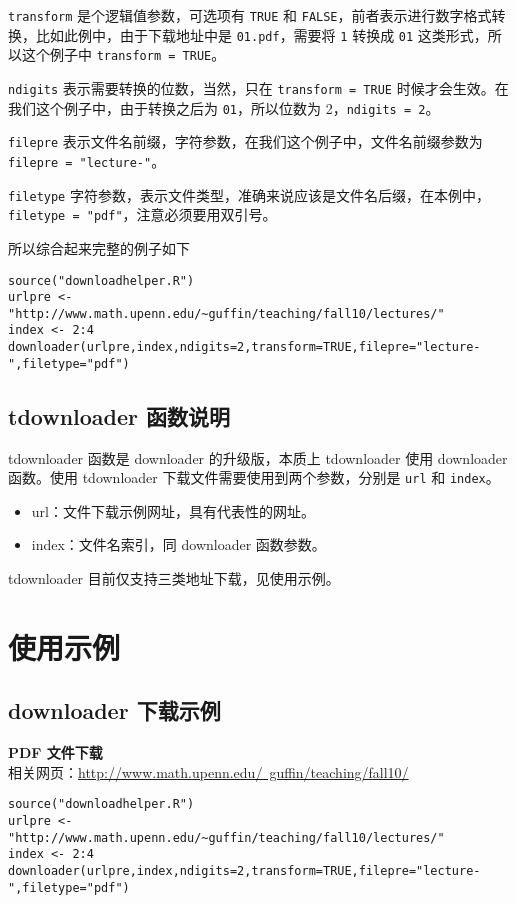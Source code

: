 \documentclass{article}
\begin{document}
\lstinline{transform} 是个逻辑值参数，可选项有 \lstinline{TRUE} 和 \lstinline{FALSE}，前者表示进行数字格式转换，比如此例中，由于下载地址中是 \lstinline{01.pdf}，需要将 \lstinline{1} 转换成 \lstinline{01} 这类形式，所以这个例子中 \lstinline{transform = TRUE}。

\lstinline{ndigits} 表示需要转换的位数，当然，只在 \lstinline{transform = TRUE} 时候才会生效。在我们这个例子中，由于转换之后为 \lstinline{01}，所以位数为 2，\lstinline{ndigits = 2}。

\lstinline{filepre} 表示文件名前缀，字符参数，在我们这个例子中，文件名前缀参数为 \lstinline{filepre = "lecture-"}。

\lstinline{filetype} 字符参数，表示文件类型，准确来说应该是文件名后缀，在本例中，\lstinline{filetype = "pdf"}，注意必须要用双引号。

所以综合起来完整的例子如下
\begin{lstlisting}
source("downloadhelper.R")
urlpre <- "http://www.math.upenn.edu/~guffin/teaching/fall10/lectures/"
index <- 2:4
downloader(urlpre,index,ndigits=2,transform=TRUE,filepre="lecture-",filetype="pdf")
\end{lstlisting}

\subsection{tdownloader 函数说明}
tdownloader 函数是 downloader 的升级版，本质上 tdownloader 使用 downloader 函数。使用 tdownloader 下载文件需要使用到两个参数，分别是 \lstinline{url} 和 \lstinline{index}。
\begin{itemize}
    \item url：文件下载示例网址，具有代表性的网址。
    \item index：文件名索引，同 downloader 函数参数。
\end{itemize}

tdownloader 目前仅支持三类地址下载，见使用示例。

\section{使用示例}
\subsection{downloader 下载示例}
\noindent\textbf{PDF 文件下载}\\
相关网页：\href{http://www.math.upenn.edu/~guffin/teaching/fall10/}{http://www.math.upenn.edu/~guffin/teaching/fall10/}
\begin{lstlisting}
source("downloadhelper.R")
urlpre <- "http://www.math.upenn.edu/~guffin/teaching/fall10/lectures/"
index <- 2:4
downloader(urlpre,index,ndigits=2,transform=TRUE,filepre="lecture-",filetype="pdf")
\end{lstlisting}
\end{document}
